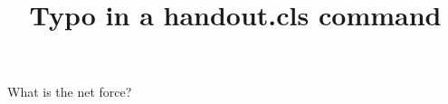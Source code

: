 \documentclass{handout}
\title{Typo in a handout.cls command}
\begin{document}
\maketitle
\begin{questions}
\question What is the net force?
\ansewrspace{1in}
\end{questions}
\end{document}

